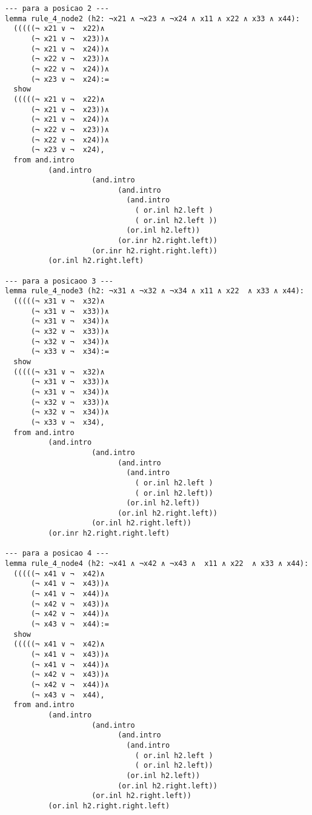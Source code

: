 \begin{enumerate}
\begin{lstlisting}
--- para a posicao 2 ---
lemma rule_4_node2 (h2: ¬x21 ∧ ¬x23 ∧ ¬x24 ∧ x11 ∧ x22 ∧ x33 ∧ x44):
  (((((¬ x21 ∨ ¬  x22)∧
      (¬ x21 ∨ ¬  x23))∧ 
      (¬ x21 ∨ ¬  x24))∧ 
      (¬ x22 ∨ ¬  x23))∧ 
      (¬ x22 ∨ ¬  x24))∧ 
      (¬ x23 ∨ ¬  x24):=
  show
  (((((¬ x21 ∨ ¬  x22)∧
      (¬ x21 ∨ ¬  x23))∧ 
      (¬ x21 ∨ ¬  x24))∧ 
      (¬ x22 ∨ ¬  x23))∧ 
      (¬ x22 ∨ ¬  x24))∧ 
      (¬ x23 ∨ ¬  x24),
  from and.intro
          (and.intro
                    (and.intro
                          (and.intro
                            (and.intro
                              ( or.inl h2.left ) 
                              ( or.inl h2.left ))
                            (or.inl h2.left))
                          (or.inr h2.right.left))
                    (or.inr h2.right.right.left))
          (or.inl h2.right.left)

--- para a posicaoo 3 ---
lemma rule_4_node3 (h2: ¬x31 ∧ ¬x32 ∧ ¬x34 ∧ x11 ∧ x22  ∧ x33 ∧ x44):
  (((((¬ x31 ∨ ¬  x32)∧
      (¬ x31 ∨ ¬  x33))∧ 
      (¬ x31 ∨ ¬  x34))∧ 
      (¬ x32 ∨ ¬  x33))∧ 
      (¬ x32 ∨ ¬  x34))∧ 
      (¬ x33 ∨ ¬  x34):=
  show
  (((((¬ x31 ∨ ¬  x32)∧
      (¬ x31 ∨ ¬  x33))∧ 
      (¬ x31 ∨ ¬  x34))∧ 
      (¬ x32 ∨ ¬  x33))∧ 
      (¬ x32 ∨ ¬  x34))∧ 
      (¬ x33 ∨ ¬  x34),
  from and.intro
          (and.intro
                    (and.intro
                          (and.intro
                            (and.intro
                              ( or.inl h2.left ) 
                              ( or.inl h2.left))
                            (or.inl h2.left))
                          (or.inl h2.right.left))
                    (or.inl h2.right.left))
          (or.inr h2.right.right.left)

--- para a posicao 4 ---
lemma rule_4_node4 (h2: ¬x41 ∧ ¬x42 ∧ ¬x43 ∧  x11 ∧ x22  ∧ x33 ∧ x44):
  (((((¬ x41 ∨ ¬  x42)∧
      (¬ x41 ∨ ¬  x43))∧ 
      (¬ x41 ∨ ¬  x44))∧ 
      (¬ x42 ∨ ¬  x43))∧ 
      (¬ x42 ∨ ¬  x44))∧ 
      (¬ x43 ∨ ¬  x44):=
  show
  (((((¬ x41 ∨ ¬  x42)∧
      (¬ x41 ∨ ¬  x43))∧ 
      (¬ x41 ∨ ¬  x44))∧ 
      (¬ x42 ∨ ¬  x43))∧ 
      (¬ x42 ∨ ¬  x44))∧ 
      (¬ x43 ∨ ¬  x44),
  from and.intro
          (and.intro
                    (and.intro
                          (and.intro
                            (and.intro
                              ( or.inl h2.left ) 
                              ( or.inl h2.left))
                            (or.inl h2.left))
                          (or.inl h2.right.left))
                    (or.inl h2.right.left))
          (or.inl h2.right.right.left)


\end{lstlisting}
\end{enumerate}
